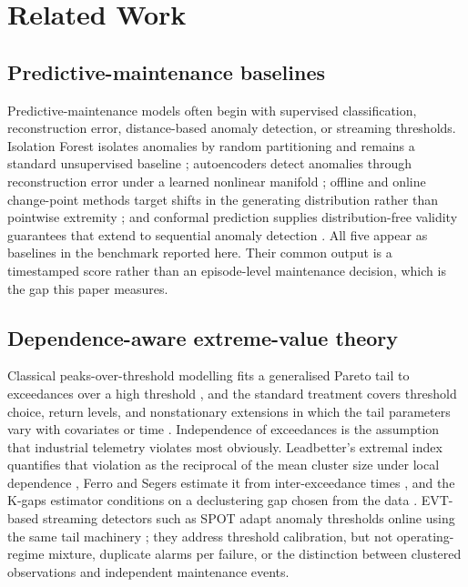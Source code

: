 \section{Related Work}
\label{sec:related}

\subsection{Predictive-maintenance baselines}

Predictive-maintenance models often begin with supervised classification, reconstruction error, distance-based anomaly detection, or streaming thresholds. Isolation Forest isolates anomalies by random partitioning and remains a standard unsupervised baseline \citep{Liu2008IsolationForest}; autoencoders detect anomalies through reconstruction error under a learned nonlinear manifold \citep{Sakurada2014Autoencoder}; offline and online change-point methods target shifts in the generating distribution rather than pointwise extremity \citep{Truong2020ChangePoint}; and conformal prediction supplies distribution-free validity guarantees \citep{Vovk2005Conformal} that extend to sequential anomaly detection \citep{Laxhammar2015ConformalAnomaly}. All five appear as baselines in the benchmark reported here. Their common output is a timestamped score rather than an episode-level maintenance decision, which is the gap this paper measures.

\subsection{Dependence-aware extreme-value theory}

Classical peaks-over-threshold modelling fits a generalised Pareto tail to exceedances over a high threshold \citep{DavisonSmith1990Exceedances}, and the standard treatment covers threshold choice, return levels, and nonstationary extensions in which the tail parameters vary with covariates or time \citep{Coles2001ExtremeValues}. Independence of exceedances is the assumption that industrial telemetry violates most obviously. Leadbetter's extremal index quantifies that violation as the reciprocal of the mean cluster size under local dependence \citep{Leadbetter1983Extremal}, Ferro and Segers estimate it from inter-exceedance times \citep{FerroSegers2003Clusters}, and the K-gaps estimator conditions on a declustering gap chosen from the data \citep{SuvegesDavison2010KGap}. EVT-based streaming detectors such as SPOT adapt anomaly thresholds online using the same tail machinery \citep{Siffer2017SPOT}; they address threshold calibration, but not operating-regime mixture, duplicate alarms per failure, or the distinction between clustered observations and independent maintenance events.

